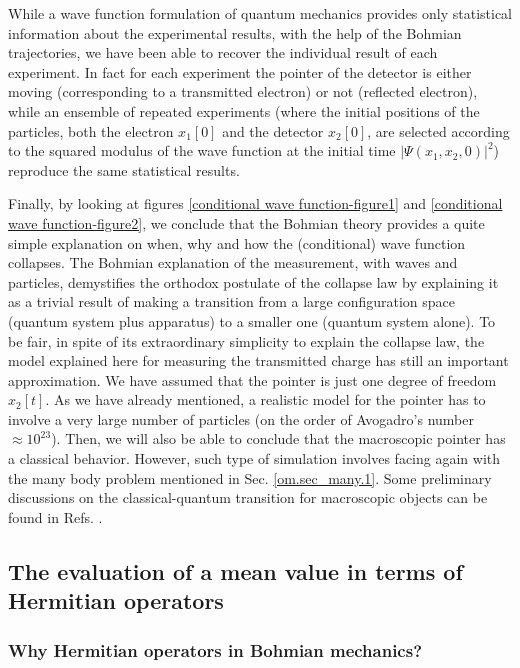 \documentclass[nofootinbib, secnumarabic, amsmath, nobibnotes,10pt,aps,pra]{revtex4-1}
\newcommand{\sref}[1]{Sec. \ref{#1}}
\begin{document}
While a wave function formulation of quantum mechanics provides only statistical information about the experimental results, with the help of the Bohmian trajectories, we have been able to recover the individual result of each experiment. In fact for each experiment the pointer of the detector is either moving (corresponding to a transmitted electron) or not (reflected electron), while an ensemble of repeated experiments (where the initial positions of the particles, both the electron $x_1[0]$ and the detector $x_2[0]$, are selected according to the squared modulus of the wave function at the initial time $|\Psi(x_1,x_2,0)|^2$) reproduce the same statistical results.

Finally, by looking at figures \ref{conditional wave function-figure1} and \ref{conditional wave  function-figure2}, we conclude that the Bohmian theory provides a quite simple explanation on when, why and how the (conditional) wave function collapses. The Bohmian explanation of the measurement, with waves and particles, demystifies the orthodox postulate of the collapse law by explaining it as a trivial result of making a transition from a large configuration space (quantum system plus apparatus) to a smaller one (quantum system alone). To be fair, in spite of its extraordinary simplicity to explain  the collapse law, the model explained here for measuring the transmitted charge has still an important approximation. We have assumed that the pointer is just one degree of freedom $x_2[t]$. As we have already mentioned, a realistic model for the pointer has to involve a very large number of particles (on the order of Avogadro's number $\approx 10^{23}$). Then, we will also be able to conclude that the macroscopic pointer has a classical behavior. However, such type of simulation involves facing again with the many body problem mentioned in \sref{om.sec_many.1}. Some preliminary discussions on the classical-quantum transition for macroscopic objects can be found in Refs. \cite{om.clasic1,om.clasic2,om.4marian,om.3xavier,om.1xavier}. 


\subsection{The evaluation of a mean value in terms of Hermitian operators}
\label{om.sec_measurement.2}


\subsubsection{Why Hermitian operators in Bohmian mechanics?}
\end{document}
